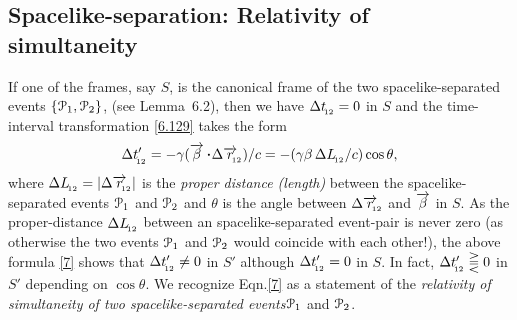 \subsection{Spacelike-separation:  Relativity
of\\ simultaneity}
If one of the frames, say $S$, is the canonical frame 
of 
the two spacelike-separated events $\{\EuScript{P}_1, 
\EuScript{P}_2\}$, (see  Lemma~6.2), then we have $ 
\Delta 
t_{_{\hspace*{-1.5pt}{12}}} = 0 $ in $S$ and the time-interval 
transformation \eqref{6.129} takes the form
\begin{align}\label{7}
\Delta t'_\sfx{12}=-\gkg (\veca{\gkb} \,
\dotp\Delta \veca{r}_\sfx{\nnt 12})/c=-(\gkg
\gkb \,\Delta L_\sfx{12}/c) \cos{\theta},
\end{align}
where $\Delta L_{_{\hspace*{-1.5pt}{12}}}=|\Delta \overrightarrow{r}_{_{\hspace*{-1.5pt}{\negthinspace\negthinspace 
12}}}|$ is 
the \textsl{proper distance (length)}  between the 
spacelike-separated events $\EuScript{P}_1$ and 
$\EuScript{P}_2$ and $\theta$ is the angle between 
$\Delta 
\overrightarrow{r}_{_{\hspace*{-1.5pt}{\negthinspace\negthinspace 12}}}$ and $ \overrightarrow{{\beta}}$ in $S$. As 
the 
proper-distance $\Delta L_{_{\hspace*{-1.5pt}{12}}}$ between an 
spacelike-separated event-pair is never zero (as 
otherwise 
the two events $\EuScript{P}_1$ and $\EuScript{P}_2$  
would coincide with each other!), the above formula   
\eqref{7} shows that  $\Delta t'_{_{\hspace*{-1.5pt}{12}}} \neq 0 $ in 
$S'$ 
although  $\Delta t'_{_{\hspace*{-1.5pt}{12}}} = 0$ in $S$. In fact, 
$\Delta 
t'_{_{\hspace*{-1.5pt}{12}}} \gtreqqless 0$ in $S'$ depending on 
$\cos{\theta}$. We recognize Eqn.\eqref{7} as a 
statement 
of 
the \textsl{relativity of simultaneity of two 
spacelike-separated events}$\EuScript{P}_1$ and 
$\EuScript{P}_2$.

